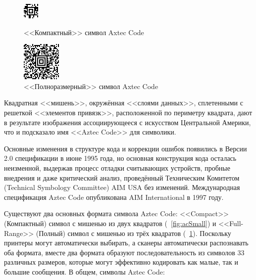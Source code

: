 \begin{figure}[htb]
    \begin{multicols}{2}
 
        \begin{center}
             \includegraphics[]{img/ac_small} 
             \caption{<<Компактный>> символ Axtec Code}
             \label{fig:acSmall}
        \end{center}
   
        \begin{center}
            \includegraphics[]{img/ac_big} 
            \caption{<<Полноразмерный>> символ Axtec Code}
            \label{fig:acBig}
        \end{center}       
       
    \end{multicols}
\end{figure}

Квадратная <<мишень>>, окружённая <<слоями данных>>, сплетенными с решеткой 
<<элементов привязк>>, расположенной по периметру квадрата, дают в результате 
изображения ассоциирующееся с искусством Центральной Америки, что и подсказало 
имя <<Aztec Code>> для символики. 

Основные изменения в структуре кода и коррекции ошибок появились в Версии 2.0 
спецификации в июне 1995 года, но основная конструкция кода осталась 
неизменной, выдержав процесс отладки считывающих устройств, пробные внедрения 
и даже критический анализ, проведённый Техническим Комитетом (Technical 
Symbology Committee) AIM USA без изменений. Международная спецификация 
Aztec Code опубликована AIM International в 1997 году.

Существуют два основных формата символа Aztec Code: <<Compact>> (Компактный) 
символ с мишенью из двух квадратов (\figurename\ \ref{fig:acSmall}) и 
<<Full-Range>> (Полный) символ с мишенью из трёх квадратов 
(\figurename\ \ref{fig:acBig}). Поскольку принтеры могут автоматически 
выбирать, а сканеры автоматически распознавать оба формата, вместе два формата 
образуют последовательность из символов 33 различных размеров, которые могут 
эффективно кодировать как малые, так и большие сообщения. В общем, 
символы Aztec Code:

